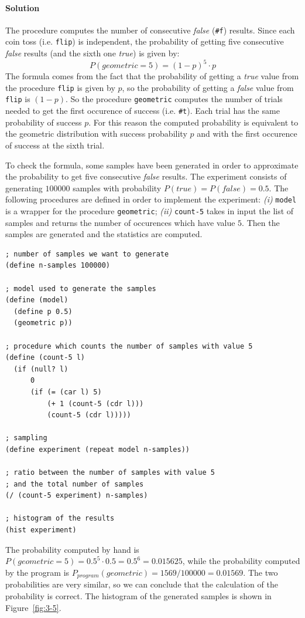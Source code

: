 \paragraph{Solution}
The procedure computes the number of consecutive \textit{false} (\texttt{\#f}) results. Since each coin toss (i.e. \texttt{flip}) is 
independent, the probability of getting five consecutive \textit{false} results (and the sixth one \textit{true}) is given by:
\[ P(geometric = 5) = (1 - p)^{5} \cdot p \]
The formula comes from the fact that the probability of getting a \textit{true} value from the procedure \texttt{flip} is given by
$p$, so the probability of getting a \textit{false} value from \texttt{flip} is $ (1 - p) $.
So the procedure \texttt{geometric} computes the number of trials needed to get the first occurence of success (i.e. \texttt{\#t}).
Each trial has the same probability of success $p$.
For this reason the computed probability is equivalent to the geometric distribution with success probability $p$ and with the 
first occurence of success at the sixth trial.

To check the formula, some samples have been generated in order to approximate the probability to get five consecutive 
\textit{false} results. The experiment consists of generating $ 100000 $ samples with probability 
$ P(true) = P(false) = 0.5 $.
The following procedures are defined in order to implement the experiment: \textit{(i)} \texttt{model} is a wrapper for the 
procedure \texttt{geometric}; \textit{(ii)} \texttt{count-5} takes in input the list of samples and returns the number of
occurences which have value $ 5 $.
Then the samples are generated and the statistics are computed.
\begin{lstlisting}[caption={Experiment to approximate the probability of getting the first occurence of success at the sixth trial},
    captionpos=b]
; number of samples we want to generate
(define n-samples 100000)

; model used to generate the samples
(define (model)
  (define p 0.5)
  (geometric p))

; procedure which counts the number of samples with value 5
(define (count-5 l)
  (if (null? l)
      0
      (if (= (car l) 5)
          (+ 1 (count-5 (cdr l)))
          (count-5 (cdr l)))))

; sampling
(define experiment (repeat model n-samples))

; ratio between the number of samples with value 5
; and the total number of samples
(/ (count-5 experiment) n-samples)

; histogram of the results
(hist experiment)
\end{lstlisting}
The probability computed by hand is $ P(geometric = 5) = 0.5^{5} \cdot 0.5 = 0.5^{6} = 0.015625 $, while the probability computed
by the program is $ P_{program}(geometric) = 1569/100000 = 0.01569 $.
The two probabilities are very similar, so we can conclude that the calculation of the probability is correct.
The histogram of the generated samples is shown in Figure~\ref{fig:3-5}.

